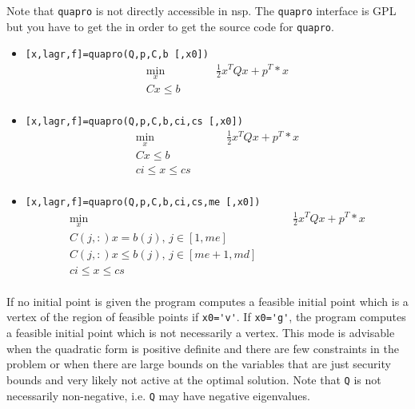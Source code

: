\begin{mandescription}

Note that \verb!quapro! is not directly accessible in nsp. The \verb!quapro! 
interface is GPL but you have to get the in order to get the source code 
for  \verb!quapro!.

\begin{itemize}
\item \verb![x,lagr,f]=quapro(Q,p,C,b [,x0])!
\begin{equation*}
\begin{split}
  \min_{x}& \hspace{1cm}  \frac{1}{2} x^T Q x + p^T *x \\
  C x \le b  & \\
\end{split}
\end{equation*}
\item  \verb![x,lagr,f]=quapro(Q,p,C,b,ci,cs [,x0])!
\begin{equation*}
\begin{split}
  \min_{x} &\hspace{1cm}  \frac{1}{2} x^T Q x + p^T *x \\
  C x \le b  & \\
  ci \le x \le cs & \\
\end{split}
\end{equation*}
\item \verb![x,lagr,f]=quapro(Q,p,C,b,ci,cs,me [,x0])!
\begin{equation*}
\begin{split}
  \min_{x} &\hspace{1cm}  \frac{1}{2} x^T Q x + p^T *x \\
  C(j,:) x = b(j) , \,  j \in [1,me] & \\
  C(j,:) x \le b(j), \, j \in [me+1,md] & \\
  ci \le x \le cs &\\
\end{split}
\end{equation*}
\end{itemize}
  If no initial point is given the
  program computes a feasible initial point
  which is a vertex of the region of feasible points if
  \verb!x0='v'!.
  If \verb!x0='g'!, the program computes a feasible initial 
  point which is not necessarily a vertex. This mode is
  advisable when the quadratic form is positive
  definite and there are  few constraints in
  the problem or when there are large bounds
  on the variables that are just security bounds and
  very likely not active at the optimal solution.
  Note that \verb!Q! is not necessarily non-negative, i.e.
  \verb!Q! may have negative eigenvalues.
\end{mandescription}
